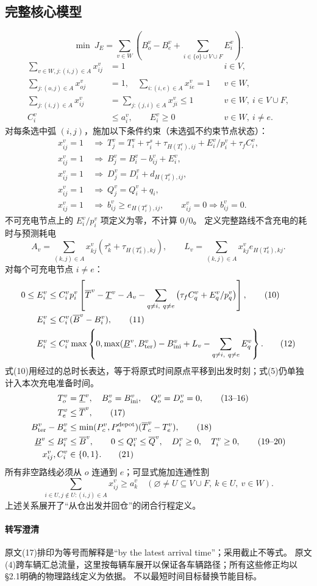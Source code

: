 \documentclass[UTF8,11pt]{ctexart}
\begin{document}
\subsection*{完整核心模型}
\[
\min\ J_E=\sum_{v\in W}\left(B_o^v-B_e^v+
 \sum_{i\in\{o\}\cup V\cup F}E_i^v\right).\tag{1}
\]
\begin{align}
\sum_{v\in W,j:(i,j)\in A}x_{ij}^v&=1 &&i\in V,\\
\sum_{j:(o,j)\in A}x_{oj}^v&=1,\quad \sum_{i:(i,e)\in A}x_{ie}^v=1 &&v\in W,\\
\sum_{j:(i,j)\in A}x_{ij}^v&=\sum_{j:(j,i)\in A}x_{ji}^v\le1
&&v\in W,\ i\in V\cup F,\\
C_i^v&\le a_i^v,\qquad E_i^v\ge0 &&v\in W,\ i\ne e.
\end{align}
对每条选中弧 $(i,j)$，施加以下条件约束（未选弧不约束节点状态）：
\begin{align}
x_{ij}^v=1&\ \Longrightarrow\
T_j^v=T_i^v+\tau_i^s+\tau_{H(T_i^v),ij}+E_i^v/p_i^v+\tau_f C_i^v,\tag{5}\\
x_{ij}^v=1&\ \Longrightarrow\ B_j^v=B_i^v-b_{ij}^v+E_i^v,\tag{6}\\
x_{ij}^v=1&\ \Longrightarrow\ D_j^v=D_i^v+d_{H(T_i^v),ij},\tag{7}\\
x_{ij}^v=1&\ \Longrightarrow\ Q_j^v=Q_i^v+q_i,\tag{8}\\
x_{ij}^v=1&\ \Longrightarrow\ b_{ij}^v\ge e_{H(T_i^v),ij},
\qquad x_{ij}^v=0\Longrightarrow b_{ij}^v=0.\tag{9}
\end{align}
不可充电节点上的 $E_i^v/p_i^v$ 项定义为零，不计算 $0/0$。
定义完整路线不含充电的耗时与预测耗电
\[
A_v=\sum_{(k,j)\in A}x_{kj}^v(\tau_k^s+\tau_{H(T_k^v),kj}),\qquad
L_v=\sum_{(k,j)\in A}x_{kj}^v e_{H(T_k^v),kj}.
\]
对每个可充电节点 $i\ne e$：
\begin{align}
0\le E_i^v&\le C_i^vp_i^v
\left[\overline T^v-\underline T^v-A_v
-\sum_{q\ne i,\ q\ne e}\left(\tau_f C_q^v+E_q^v/p_q^v\right)\right],\tag{10}\\
E_i^v&\le C_i^v(\overline B^v-B_i^v),\tag{11}\\
E_i^v&\le C_i^v\max\left\{0,\max(\underline B^v,B_{\rm ter}^v)
-B_{\rm ini}^v+L_v-\sum_{q\ne i,\ q\ne e}E_q^v\right\}.\tag{12}
\end{align}
式(10)用经过的总时长表达，等于将原式时间原点平移到出发时刻；式(5)仍单独计入本次充电准备时间。
\begin{align}
T_o^v&=\underline T^v,\quad B_o^v=B_{\rm ini}^v,\quad Q_o^v=D_o^v=0,\tag{13--16}\\
T_e^v&\le\overline T^v,\tag{17}\\
B_{\rm ter}^v-B_e^v&\le
\min(P_c^v,P_n^{\rm depot})(\overline T_c^v-T_e^v),\tag{18}\\
\underline B^v\le B_i^v&\le\overline B^v,\qquad
0\le Q_i^v\le\overline Q^v,\quad D_i^v\ge0,\quad T_i^v\ge0,\tag{19--20}\\
x_{ij}^v,C_i^v&\in\{0,1\}.\tag{21}
\end{align}
所有非空路线必须从 $o$ 连通到 $e$；可显式施加连通性割
\[
\sum_{i\in U,j\notin U:(i,j)\in A}x_{ij}^v\ge a_k^v
\quad(\varnothing\ne U\subseteq V\cup F,\ k\in U,\ v\in W).
\]
上述关系展开了“从仓出发并回仓”的闭合行程定义。
\paragraph{转写澄清}
原文(17)排印为等号而解释是“by the latest arrival time”；采用截止不等式。
原文(4)跨车辆汇总流量，这里按每辆车展开以保证各车辆路径；所有这些修正均以§2.1明确的物理路线定义为依据。
不以最短时间目标替换节能目标。
\end{document}
